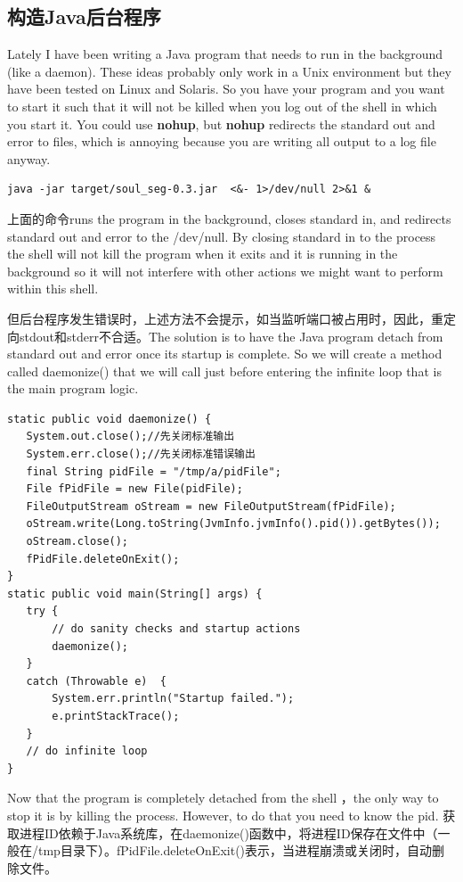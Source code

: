 \subsection{构造Java后台程序}
\par Lately I have been writing a Java program that needs to run in the background (like a daemon). These ideas probably only work in a Unix environment but they have been tested on Linux and Solaris. So you have your program and you want to start it such that it will not be killed when you log out of the shell in which you start it. You could use \textbf{nohup}, but \textbf{nohup} redirects the standard out and error to files, which is annoying because you are writing all output to a log file anyway. 
\begin{verbatim}
java -jar target/soul_seg-0.3.jar  <&- 1>/dev/null 2>&1 &
\end{verbatim}
\par 上面的命令runs the program in the background, closes standard in, and redirects standard out and error to the /dev/null. By closing standard in to the process the shell will not kill the program when it exits and it is running in the background so it will not interfere with other actions we might want to perform within this shell.
\par 但后台程序发生错误时，上述方法不会提示，如当监听端口被占用时，因此，重定向stdout和stderr不合适。The solution is to have the Java program detach from standard out and error once its startup is complete. So we will create a method called daemonize() that we will call just before entering the infinite loop that is the main program logic.
\begin{verbatim}
static public void daemonize() {
   System.out.close();//先关闭标准输出
   System.err.close();//先关闭标准错误输出
   final String pidFile = "/tmp/a/pidFile";
   File fPidFile = new File(pidFile);
   FileOutputStream oStream = new FileOutputStream(fPidFile);
   oStream.write(Long.toString(JvmInfo.jvmInfo().pid()).getBytes());
   oStream.close();
   fPidFile.deleteOnExit();
}
static public void main(String[] args) {
   try {
       // do sanity checks and startup actions
       daemonize();
   }
   catch (Throwable e)  {
       System.err.println("Startup failed.");
       e.printStackTrace();
   }
   // do infinite loop
}
\end{verbatim}
\par Now that the program is completely detached from the shell ，the only way to stop it is by killing the process. However, to do that you need to know the pid. 获取进程ID依赖于Java系统库，在daemonize()函数中，将进程ID保存在文件中（一般在/tmp目录下）。fPidFile.deleteOnExit()表示，当进程崩溃或关闭时，自动删除文件。
